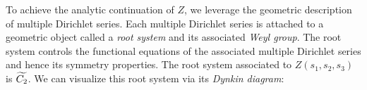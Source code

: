\documentclass[12pt,reqno,oneside]{amsart}
\begin{document}
To achieve the analytic continuation of $Z$, we leverage the geometric description of multiple Dirichlet series. Each multiple Dirichlet series is attached to a geometric object called a \textit{root system} and its associated \textit{Weyl group}. The root system controls the functional equations of the associated multiple Dirichlet series and hence its symmetry properties. The root system associated to $Z(s_{1},s_{2},s_{3})$ is $\widetilde{C_{2}}$. We can visualize this root system via its \textit{Dynkin diagram}:

\begin{center}
\end{center}
\end{document}
